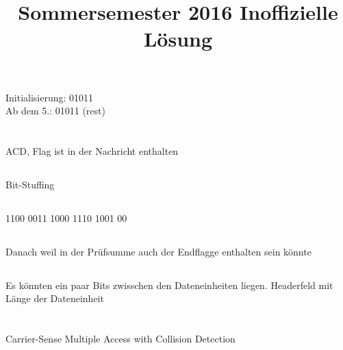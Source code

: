 \documentclass[a4paper]{article}
\title{Sommersemester 2016 Inoffizielle Lösung}
\begin{document}
\section{}
\subsection{}
\subsection{}
\subsection{}
\subsection{}
\subsection{}
Initialisierung: 01011 \\
Ab dem 5.: 01011 (rest)
\section{}
\subsection{}
ACD, Flag ist in der Nachricht enthalten
\subsection{}
Bit-Stuffing
\subsection{}
1100 0011 1000 1110 1001 00
\subsection{}
Danach weil in der Prüfsumme auch der Endflagge enthalten sein könnte
\subsection{}
Es könnten ein paar Bits zwisschen den Dateneinheiten liegen.
Headerfeld mit Länge der Dateneinheit
\section{}
\subsection{}
Carrier-Sense Multiple Access with Collision Detection
\end{document}
